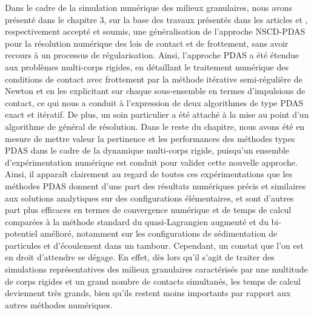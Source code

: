 Dans le cadre de la simulation numérique des milieux granulaires, nous avons présenté dans le chapitre $3$, sur la base des travaux présentés dans les articles \cite{abide2021semismooth} et \cite{abide2021unified}, respectivement accepté et soumis, une généralisation de l'approche NSCD-PDAS pour la résolution numérique des lois de contact et de frottement, sans avoir recours à un processus de régularisation. Ainsi, l'approche PDAS a été étendue aux problèmes multi-corps rigides, en détaillant le traitement numérique des conditions de contact avec frottement par la méthode itérative semi-régulière de Newton et en les explicitant sur chaque sous-ensemble en termes d’impulsions de contact, ce qui nous a conduit à l'expression de deux algorithmes de type PDAS exact et itératif. De plus, un soin particulier a été attaché à la mise au point d'un algorithme de général de résolution. Dans le reste du chapitre, nous avons été en mesure de mettre valeur la pertinence et les performances des méthodes types PDAS dans le cadre de la dynamique multi-corps rigide, puisqu'un ensemble d'expérimentation numérique est conduit pour valider cette nouvelle approche. Ainsi, il apparaît clairement au regard de toutes ces expérimentations que les méthodes PDAS donnent d'une part des résultats numériques précis et similaires aux solutions analytiques sur des configurations élémentaires, et sont d'autres part plus efficaces en termes de convergence numérique et de temps de calcul comparées à la méthode standard du quasi-Lagrangien augmenté et du bi-potentiel amélioré, notamment sur les configurations de sédimentation de particules et d'écoulement dans un tambour. Cependant, un constat que l'on est en droit d'attendre se dégage. En effet, dès lors qu'il s'agit de traiter des simulations représentatives des milieux granulaires caractérisés par une multitude de corps rigides et un grand nombre de contacts simultanés, les temps de calcul deviennent très grands, bien qu'ils restent moins importants par rapport aux autres méthodes numériques.\\

